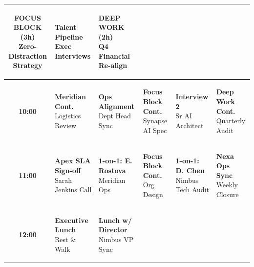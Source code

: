\documentclass[10pt, landscape]{article}
\begin{document}
\begin{minipage}[t]{0.72\linewidth}
\begin{tabularx}{\linewidth}{|c|>{\raggedright\arraybackslash}X|>{\raggedright\arraybackslash}X|>{\raggedright\arraybackslash}X|>{\raggedright\arraybackslash}X|>{\raggedright\arraybackslash}X|}
    \colorbox{DeepWorkBg}{\parbox[t]{0.92\linewidth}{\tiny\color{DeepWorkTxt}\textbf{FOCUS BLOCK (3h)}\\Zero-Distraction Strategy}} &
    \colorbox{MeetingBg}{\parbox[t]{0.92\linewidth}{\tiny\color{MeetingTxt}\textbf{Talent Pipeline}\\Exec Interviews}} &
    \colorbox{DeepWorkBg}{\parbox[t]{0.92\linewidth}{\tiny\color{DeepWorkTxt}\textbf{DEEP WORK (2h)}\\Q4 Financial Re-align}} \\
    \hline
    \textbf{10:00} &
    \colorbox{MeetingBg}{\parbox[t]{0.92\linewidth}{\tiny\color{MeetingTxt}\textbf{Meridian Cont.}\\Logistics Review}} &
    \colorbox{MeetingBg}{\parbox[t]{0.92\linewidth}{\tiny\color{MeetingTxt}\textbf{Ops Alignment}\\Dept Head Sync}} &
    \colorbox{DeepWorkBg}{\parbox[t]{0.92\linewidth}{\tiny\color{DeepWorkTxt}\textbf{Focus Block Cont.}\\Synapse AI Spec}} &
    \colorbox{MeetingBg}{\parbox[t]{0.92\linewidth}{\tiny\color{MeetingTxt}\textbf{Interview 2}\\Sr AI Architect}} &
    \colorbox{DeepWorkBg}{\parbox[t]{0.92\linewidth}{\tiny\color{DeepWorkTxt}\textbf{Deep Work Cont.}\\Quarterly Audit}} \\
    \hline
    \textbf{11:00} &
    \colorbox{ClientBg}{\parbox[t]{0.92\linewidth}{\tiny\color{ClientTxt}\textbf{Apex SLA Sign-off}\\Sarah Jenkins Call}} &
    \colorbox{MeetingBg}{\parbox[t]{0.92\linewidth}{\tiny\color{MeetingTxt}\textbf{1-on-1: E. Rostova}\\Meridian Ops}} &
    \colorbox{DeepWorkBg}{\parbox[t]{0.92\linewidth}{\tiny\color{DeepWorkTxt}\textbf{Focus Block Cont.}\\Org Design}} &
    \colorbox{MeetingBg}{\parbox[t]{0.92\linewidth}{\tiny\color{MeetingTxt}\textbf{1-on-1: D. Chen}\\Nimbus Tech Audit}} &
    \colorbox{MeetingBg}{\parbox[t]{0.92\linewidth}{\tiny\color{MeetingTxt}\textbf{Nexa Ops Sync}\\Weekly Closure}} \\
    \hline
    \textbf{12:00} &
    \colorbox{PersonalBg}{\parbox[t]{0.92\linewidth}{\tiny\color{PersonalTxt}\textbf{Executive Lunch}\\Rest \& Walk}} &
    \colorbox{PersonalBg}{\parbox[t]{0.92\linewidth}{\tiny\color{PersonalTxt}\textbf{Lunch w/ Director}\\Nimbus VP Sync}} &

\end{tabularx}
\end{minipage}
\end{document}

